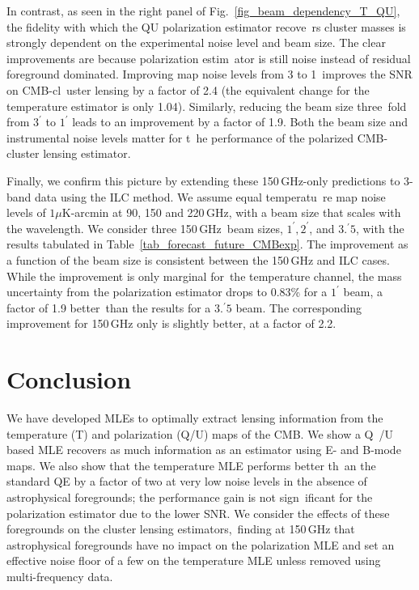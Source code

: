 In contrast, as seen in the right panel of Fig.~\ref{fig_beam_dependency_T_QU}, the fidelity with which the QU polarization estimator recove\
rs cluster masses is strongly dependent on the experimental noise level and beam size. The clear improvements are because polarization estim\
ator is still noise instead of residual foreground dominated. Improving map noise levels from 3 to 1\,\ukarcmin{} improves the SNR on CMB-cl\
uster lensing by a factor of 2.4 (the equivalent change for the temperature estimator is only 1.04). Similarly, reducing the beam size three\
fold from $3^\prime$ to $1^\prime$ leads to an improvement by a factor of 1.9. Both the beam size and instrumental noise levels matter for t\
he performance of the polarized CMB-cluster lensing estimator.

Finally, we confirm this picture by extending these 150\,GHz-only predictions to 3-band data using the ILC method. We assume equal temperatu\
re map noise levels of $1 \mu$K-arcmin at 90, 150 and 220\,GHz, with a beam size that scales with the wavelength. We consider three 150\,GHz\
 beam sizes, $1^\prime, 2^\prime$, and $3.^\prime 5$, with the results  tabulated in Table~\ref{tab_forecast_future_CMBexp}.
The improvement  as a function of the beam size is consistent between the 150\,GHz and ILC cases. While the improvement is only marginal for\
 the temperature channel, the mass uncertainty from the polarization estimator drops to 0.83\% for a $1^\prime$ beam, a factor of 1.9 better\
 than the results for a $3.^\prime5$ beam. The corresponding improvement for 150\,GHz only is slightly better, at a factor of 2.2.
 
 \section{Conclusion}
\label{sec_conclusion}
We have developed MLEs to optimally extract lensing information from the temperature (T) and polarization (Q/U) maps of the CMB. We show a Q\
/U based MLE recovers as much information as an estimator using E- and B-mode maps. We also show that the temperature MLE performs better th\
an the standard QE by a factor of two at very low noise levels in the absence of astrophysical foregrounds; the performance gain is not sign\
ificant for the polarization estimator due to the lower SNR. We consider the effects of these foregrounds on the cluster lensing estimators,\
 finding at 150\,GHz that  astrophysical foregrounds have no impact on the polarization MLE and set an effective noise floor of a few \ukarcmin{} on the temperature MLE unless removed using multi-frequency data.

